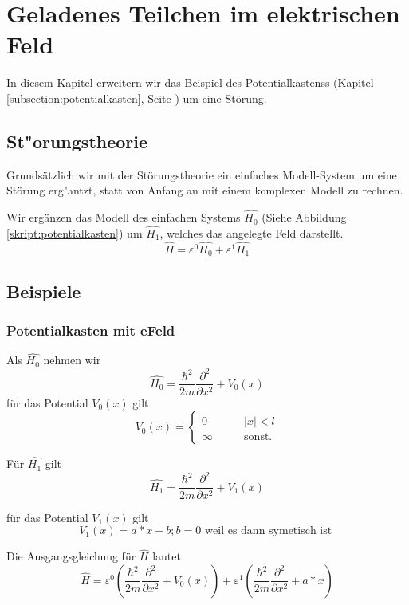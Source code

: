 \chapter{Geladenes Teilchen im elektrischen Feld\label{chapter:efeld}}
\begin{refsection}


In diesem Kapitel erweitern wir das Beispiel des Potentialkastenss 
(Kapitel \ref{subsection:potentialkasten}, Seite \pageref{subsection:potentialkasten})
um eine St\"orung.

\section{ St"orungstheorie }
Grundsätzlich wir mit der St\"orungstheorie ein einfaches Modell-System um eine St\"orung
erg"antzt, statt von Anfang an mit einem komplexen Modell zu rechnen.

Wir erg\"anzen das Modell des einfachen Systems $\hat{H_0}$
(Siehe Abbildung \ref{skript:potentialkasten})
um $\hat{H_1}$, welches das angelegte Feld darstellt.
\[
\hat{H} = \varepsilon^0 \hat{H_0} + \varepsilon^1 \hat{H_1}
\]





\section{ Beispiele }

\subsection{ Potentialkasten mit eFeld }
Als $\hat{H_0}$ nehmen wir
\[
  \hat{H_0} = \frac{\hbar^2}{2m} \frac{\partial^2}{\partial x^2} + V_0(x)
\]
f\"ur das Potential $V_0(x)$ gilt
\[
  V_0(x)=\begin{cases}
    0       & \qquad |x|<l\\
    \infty  & \qquad\text{sonst.}
  \end{cases}
\]

F\"ur $\hat{H_1}$ gilt
\[
  \hat{H_1} = \frac{\hbar^2}{2m} \frac{\partial^2}{\partial x^2} + V_1(x)
\]

f\"ur das Potential $V_1(x)$ gilt
\[
  V_1(x) = a*x +b ; b = 0 \text{ weil es dann symetisch ist }
\]

Die Ausgangsgleichung f\"ur $\hat{H}$ lautet
\[
  \hat{H} = \varepsilon^0 ( \frac{\hbar^2}{2m} \frac{\partial^2}{\partial x^2} + V_0(x) )
            + \varepsilon^1 ( \frac{\hbar^2}{2m} \frac{\partial^2}{\partial x^2} + a*x )
\]


\end{refsection}
